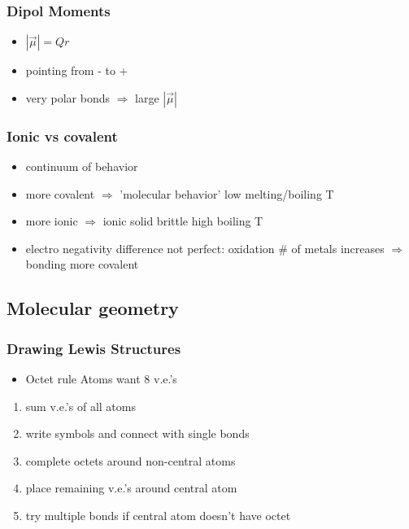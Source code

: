 \documentclass[ wastespaceontitle, english]{cheat_sheet_template}
\begin{document}
    \subsubsection{Dipol Moments}
    \begin{itemize}
        \item $ |\Vec{\mu}| = Q r$ 
        \item pointing from - to +
        \item very polar bonds $\Rightarrow$ large $ |\Vec{\mu}|$
    \end{itemize}
    \subsubsection{Ionic vs covalent}
    \begin{itemize}
        \item continuum of behavior 
        \item more covalent $\Rightarrow$ 'molecular behavior' low melting/boiling T
        \item more ionic $\Rightarrow$ ionic solid brittle high boiling T
        \item electro negativity difference not perfect: oxidation \# of metals increases  $\Rightarrow$  bonding more covalent 
    \end{itemize}
    
    \subsection{Molecular geometry}
    

    \subsubsection{Drawing Lewis Structures}
    \begin{itemize}
        \item Octet rule Atoms want 8 v.e.'s
    \end{itemize}
    \begin{enumerate}
        \item sum v.e.'s of all atoms
        \item write symbols and connect with single bonds
        \item complete octets around non-central atoms
        \item place remaining v.e.'s around central atom
        \item try multiple bonds if central atom doesn't have octet
    \end{enumerate}
\end{document}
